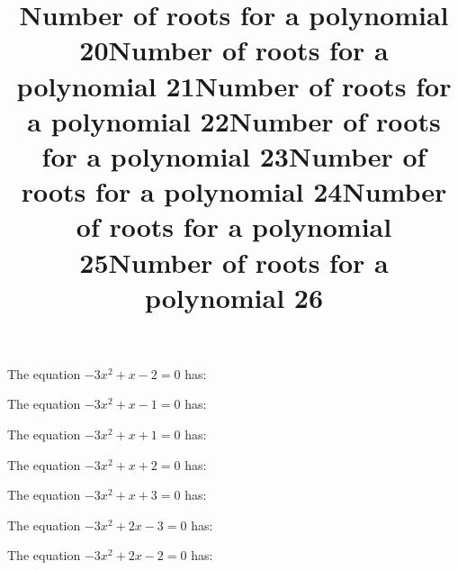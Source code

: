 \documentclass{article}
\begin{document}
\begin{category}
\begin{question}[multichoice]
\end{question}
\begin{question}[multichoice]
\title{Number of roots for a polynomial 20}
The equation $- 3 x^{2} + x - 2=0$ has:


\end{question}
\begin{question}[multichoice]
\title{Number of roots for a polynomial 21}
The equation $- 3 x^{2} + x - 1=0$ has:


\end{question}
\begin{question}[multichoice]
\title{Number of roots for a polynomial 22}
The equation $- 3 x^{2} + x + 1=0$ has:


\end{question}
\begin{question}[multichoice]
\title{Number of roots for a polynomial 23}
The equation $- 3 x^{2} + x + 2=0$ has:


\end{question}
\begin{question}[multichoice]
\title{Number of roots for a polynomial 24}
The equation $- 3 x^{2} + x + 3=0$ has:


\end{question}
\begin{question}[multichoice]
\title{Number of roots for a polynomial 25}
The equation $- 3 x^{2} + 2 x - 3=0$ has:


\end{question}
\begin{question}[multichoice]
\title{Number of roots for a polynomial 26}
The equation $- 3 x^{2} + 2 x - 2=0$ has:


\end{question}
\end{category}
\end{document}
